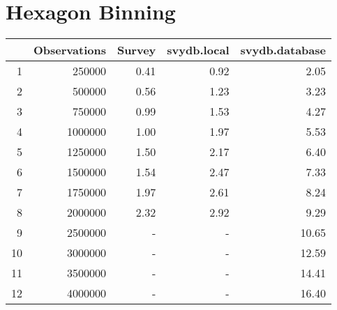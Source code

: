 \newpage
\section{Hexagon Binning}
\begin{table}[ht]
\centering
\begin{tabular}{rrrrr}
  \hline
 & Observations & Survey & svydb.local & svydb.database \\ 
  \hline
1 & 250000 & 0.41 & 0.92 & 2.05 \\ 
  2 & 500000 & 0.56 & 1.23 & 3.23 \\ 
  3 & 750000 & 0.99 & 1.53 & 4.27 \\ 
  4 & 1000000 & 1.00 & 1.97 & 5.53 \\ 
  5 & 1250000 & 1.50 & 2.17 & 6.40 \\ 
  6 & 1500000 & 1.54 & 2.47 & 7.33 \\ 
  7 & 1750000 & 1.97 & 2.61 & 8.24 \\ 
  8 & 2000000 & 2.32 & 2.92 & 9.29 \\ 
  9 & 2500000 & - & - & 10.65 \\ 
  10 & 3000000 & - & - & 12.59 \\ 
  11 & 3500000 & - & - & 14.41 \\ 
  12 & 4000000 & - & - & 16.40 \\ 
  \hline
\end{tabular}
\end{table}
